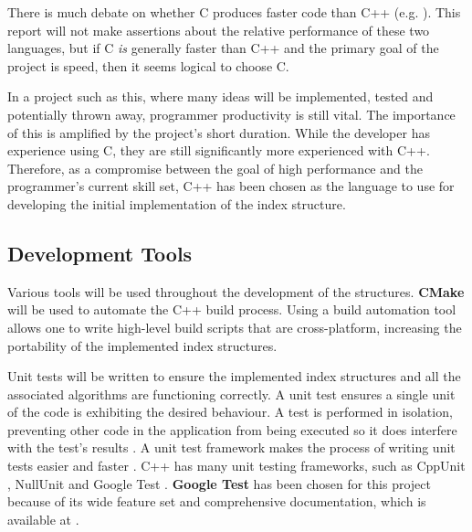 There is much debate on whether C produces faster code than C++ (e.g. \cite{c-vs-cpp1, c-vs-cpp2, c-vs-cpp3}). This report will not make assertions about the relative performance of these two languages, but if C \textit{is} generally faster than C++ and the primary goal of the project is speed, then it seems logical to choose C.

In a project such as this, where many ideas will be implemented, tested and potentially thrown away, programmer productivity is still vital. The importance of this is amplified by the project's short duration. While the developer has experience using C, they are still significantly more experienced with C++. Therefore, as a compromise between the goal of high performance and the programmer's current skill set, C++ has been chosen as the language to use for developing the initial implementation of the index structure. 

\subsection{Development Tools}
\label{sec:development-tools}

Various tools will be used throughout the development of the structures. \textbf{CMake} \cite{cmake} will be used to automate the C++ build process. Using a build automation tool allows one to write high-level build scripts that are cross-platform, increasing the portability of the implemented index structures.

Unit tests will be written to ensure the implemented index structures and all the associated algorithms are functioning correctly. A unit test ensures a single unit of the code is exhibiting the desired behaviour. A test is performed in isolation, preventing other code in the application from being executed so it does interfere with the test's results \cite{automated-defect-prevention}. A unit test framework makes the process of writing unit tests easier and faster \cite{unit-test-frameworks}. C++ has many unit testing frameworks, such as CppUnit \cite{cppunit}, NullUnit \cite{nullunit} and Google Test \cite{google-test}. \textbf{Google Test} has been chosen for this project because of its wide feature set and comprehensive documentation, which is available at \cite{google-test}.

